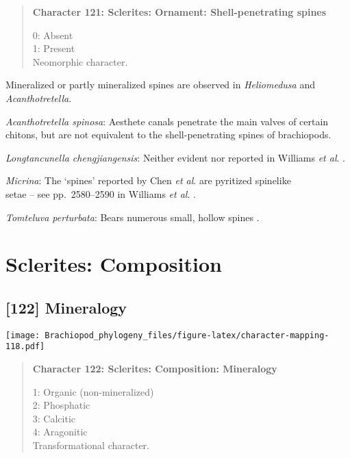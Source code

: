 \documentclass[openany]{book}
\theoremstyle{definition}
\theoremstyle{definition}
\theoremstyle{definition}
\theoremstyle{remark}
\begin{document}
\begin{quote}
\textbf{Character 121: Sclerites: Ornament: Shell-penetrating spines}

0: Absent\\
1: Present\\
Neomorphic character.
\end{quote}

Mineralized or partly mineralized spines are observed in
\emph{Heliomedusa} and \emph{Acanthotretella}.

\hypertarget{Acanthotretella_spinosa-coding-121}{}
\emph{Acanthotretella spinosa}: Aesthete canals penetrate the main
valves of certain chitons, but are not equivalent to the
shell-penetrating spines of brachiopods.

\hypertarget{Longtancunella_chengjiangensis-coding-121}{}
\emph{Longtancunella chengjiangensis}: Neither evident nor reported in
Williams \emph{et al}.
\citeyearpar{Williams2000LinguliformeaCraniiformea}.

\hypertarget{Micrina-coding-121}{}
\emph{Micrina}: The `spines' reported by Chen \emph{et al}.
\citeyearpar{Chen2007Reinterpretationof} are pyritized spinelike\\
setae -- see pp.~2580--2590 in Williams \emph{et al}.
\citeyearpar{Williams2007Supplement}.

\hypertarget{Tomteluva_perturbata-coding-121}{}
\emph{Tomteluva perturbata}: Bears numerous small, hollow spines
\citep{Williams2000LinguliformeaCraniiformea}.

\section{Sclerites: Composition}\label{sclerites-composition}

\subsection*{{[}122{]} Mineralogy}\label{mineralogy}

\texttt{[image: Brachiopod\_phylogeny\_files/figure-latex/character-mapping-118.pdf]}

\begin{quote}
\textbf{Character 122: Sclerites: Composition: Mineralogy}

1: Organic (non-mineralized)\\
2: Phosphatic\\
3: Calcitic\\
4: Aragonitic\\
Transformational character.
\end{quote}
\end{document}
